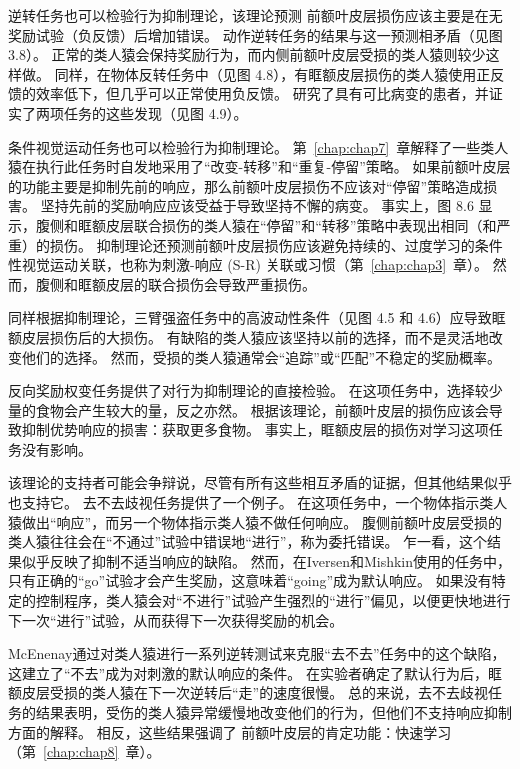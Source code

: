 逆转任务也可以检验行为抑制理论，该理论预测 前额叶皮层损伤应该主要是在无奖励试验（负反馈）后增加错误。
动作逆转任务的结果与这一预测相矛盾（见图3.8）。
正常的类人猿会保持奖励行为，而内侧前额叶皮层受损的类人猿则较少这样做\cite{kennerley2006optimal,rudebeck2008amygdala}。
同样，在物体反转任务中（见图 4.8），有眶额皮层损伤的类人猿使用正反馈的效率低下，但几乎可以正常使用负反馈\cite{rudebeck2008amygdala}。
研究了具有可比病变的患者，并证实了两项任务的这些发现（见图 4.9）。
\par


条件视觉运动任务也可以检验行为抑制理论。
第~\ref{chap:chap7}~章解释了一些类人猿在执行此任务时自发地采用了“改变-转移”和“重复-停留”策略\cite{wise1999role}。
如果前额叶皮层的功能主要是抑制先前的响应，那么前额叶皮层损伤不应该对“停留”策略造成损害。
坚持先前的奖励响应应该受益于导致坚持不懈的病变。
事实上，图 8.6 显示，腹侧和眶额皮层联合损伤的类人猿在“停留”和“转移”策略中表现出相同（和严重）的损伤。
抑制理论还预测前额叶皮层损伤应该避免持续的、过度学习的条件性视觉运动关联，也称为刺激-响应 (S-R) 关联或习惯（第~\ref{chap:chap3}~章）。
然而，腹侧和眶额皮层的联合损伤会导致严重损伤\cite{bussey2001role}。
\par


同样根据抑制理论，三臂强盗任务中的高波动性条件（见图 4.5 和 4.6）应导致眶额皮层损伤后的大损伤。
有缺陷的类人猿应该坚持以前的选择，而不是灵活地改变他们的选择。
然而，受损的类人猿通常会“追踪”或“匹配”不稳定的奖励概率\cite{walton2010separable}。
\par


反向奖励权变任务提供了对行为抑制理论的直接检验。
在这项任务中，选择较少量的食物会产生较大的量，反之亦然。
根据该理论，前额叶皮层的损伤应该会导致抑制优势响应的损害：获取更多食物。
事实上，眶额皮层的损伤对学习这项任务没有影响\cite{chudasama2007rhesus}。
\par


该理论的支持者可能会争辩说，尽管有所有这些相互矛盾的证据，但其他结果似乎也支持它。
去不去歧视任务提供了一个例子。
在这项任务中，一个物体指示类人猿做出“响应”，而另一个物体指示类人猿不做任何响应。
腹侧前额叶皮层受损的类人猿往往会在“不通过”试验中错误地“进行”\cite{iversen1970perseverative}，称为委托错误。
乍一看，这个结果似乎反映了抑制不适当响应的缺陷。
然而，在Iversen和Mishkin使用的任务中，只有正确的“go”试验才会产生奖励，这意味着“going”成为默认响应。
如果没有特定的控制程序，类人猿会对“不进行”试验产生强烈的“进行”偏见，以便更快地进行下一次“进行”试验，从而获得下一次获得奖励的机会。
\par


McEnenay\cite{mcenaney1969perseveration}通过对类人猿进行一系列逆转测试来克服“去不去”任务中的这个缺陷，这建立了“不去”成为对刺激的默认响应的条件。
在实验者确定了默认行为后，眶额皮层受损的类人猿在下一次逆转后“走”的速度很慢。
总的来说，去不去歧视任务的结果表明，受伤的类人猿异常缓慢地改变他们的行为，但他们不支持响应抑制方面的解释。
相反，这些结果强调了 前额叶皮层的肯定功能：快速学习（第~\ref{chap:chap8}~章）。
\par


